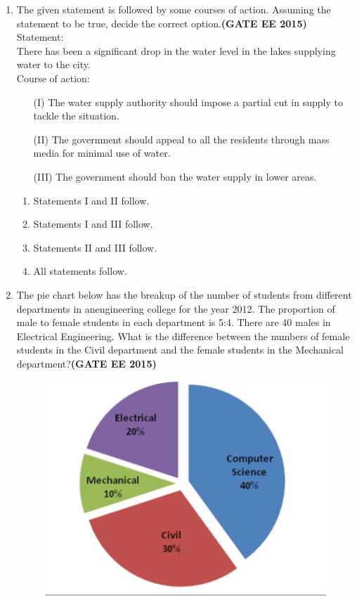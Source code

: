 \documentclass[a4paper,12pt]{exam}
\theoremstyle{remark}
\begin{document}
\begin{enumerate}
\item The given statement is followed by some courses of action. Assuming the statement to be true, decide the correct option.\hfill{\textbf{(GATE EE 2015)}}\\
Statement:\\
There has been a significant drop in the water level in the lakes supplying water to the city.\\
Course of action:\\
\begin{enumerate}
\item[(I)] The water supply authority should impose a partial cut in supply to tackle the situation.
\item[(II)] The government should appeal to all the residents through mass media for minimal use of water.
\item[(III)] The government should ban the water supply in lower areas.
\end{enumerate}
    \begin{multicols}{2}
    \begin{enumerate}   
        \item Statements I and II follow.
        \item Statements I and III follow.
        \item Statements II and III follow.
        \item All statements follow.
    \end{enumerate}
    \end{multicols}
\item The pie chart below has the breakup of the number of students from different departments in anengineering college for the year 2012. The proportion of male to female students in each
department is 5:4. There are 40 males in Electrical Engineering. What is the difference between the numbers of female students in the Civil department and the female students in the Mechanical department?\hfill{\textbf{(GATE EE 2015)}}
\begin{figure}[H]
    \centering
    \includegraphics[width=0.5\columnwidth]{figs/Q 8.png}

\end{figure}
\end{enumerate}
\end{document}
